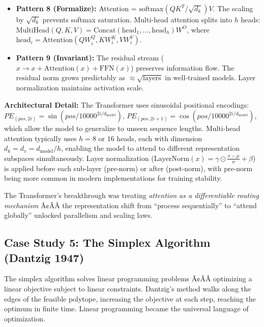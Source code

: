\begin{itemize}
\item \textbf{Pattern 8 (Formalize):} Attention = $\text{softmax}(QK^T/\sqrt{d_k})V$. The scaling by $\sqrt{d_k}$ prevents softmax saturation. Multi-head attention splits into $h$ heads: $\text{MultiHead}(Q, K, V) = \text{Concat}(\text{head}_1, \dots, \text{head}_h)W^O$, where $\text{head}_i = \text{Attention}(QW_i^Q, KW_i^K, VW_i^V)$.

\item \textbf{Pattern 9 (Invariant):} The residual stream ($x \to x + \text{Attention}(x) + \text{FFN}(x)$) preserves information flow. The residual norm grows predictably as $\approx \sqrt{\text{layers}}$ in well-trained models. Layer normalization maintains activation scale.
\end{itemize}

\textbf{Architectural Detail:} The Transformer uses sinusoidal positional encodings: $PE_{(pos,2i)} = \sin(pos/10000^{2i/d_{\text{model}}})$, $PE_{(pos,2i+1)} = \cos(pos/10000^{2i/d_{\text{model}}})$, which allow the model to generalize to unseen sequence lengths. Multi-head attention typically uses $h = 8$ or $16$ heads, each with dimension $d_k = d_v = d_{\text{model}}/h$, enabling the model to attend to different representation subspaces simultaneously. Layer normalization ($\text{LayerNorm}(x) = \gamma \odot \frac{x - \mu}{\sigma} + \beta$) is applied before each sub-layer (pre-norm) or after (post-norm), with pre-norm being more common in modern implementations for training stability.

\begin{mentalLeap}The Transformer's breakthrough was treating \emph{attention as a differentiable routing mechanism} Ã¢ÂÂ the representation shift from ``process sequentially'' to ``attend globally'' unlocked parallelism and scaling laws.\end{mentalLeap}

\subsection{Case Study 5: The Simplex Algorithm (Dantzig 1947)}

The simplex algorithm solves linear programming problems Ã¢ÂÂ optimizing a linear objective subject to linear constraints. Dantzig's method walks along the edges of the feasible polytope, increasing the objective at each step, reaching the optimum in finite time. Linear programming became the universal language of optimization.

